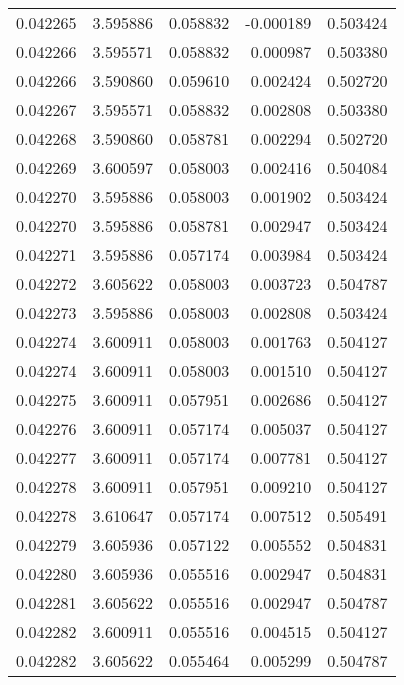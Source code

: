 \begin{tabular}{lrrrr}
0.042265    &  3.595886 &  0.058832 & -0.000189 &             0.503424 \\
0.042266    &  3.595571 &  0.058832 &  0.000987 &             0.503380 \\
0.042266    &  3.590860 &  0.059610 &  0.002424 &             0.502720 \\
0.042267    &  3.595571 &  0.058832 &  0.002808 &             0.503380 \\
0.042268    &  3.590860 &  0.058781 &  0.002294 &             0.502720 \\
0.042269    &  3.600597 &  0.058003 &  0.002416 &             0.504084 \\
0.042270    &  3.595886 &  0.058003 &  0.001902 &             0.503424 \\
0.042270    &  3.595886 &  0.058781 &  0.002947 &             0.503424 \\
0.042271    &  3.595886 &  0.057174 &  0.003984 &             0.503424 \\
0.042272    &  3.605622 &  0.058003 &  0.003723 &             0.504787 \\
0.042273    &  3.595886 &  0.058003 &  0.002808 &             0.503424 \\
0.042274    &  3.600911 &  0.058003 &  0.001763 &             0.504127 \\
0.042274    &  3.600911 &  0.058003 &  0.001510 &             0.504127 \\
0.042275    &  3.600911 &  0.057951 &  0.002686 &             0.504127 \\
0.042276    &  3.600911 &  0.057174 &  0.005037 &             0.504127 \\
0.042277    &  3.600911 &  0.057174 &  0.007781 &             0.504127 \\
0.042278    &  3.600911 &  0.057951 &  0.009210 &             0.504127 \\
0.042278    &  3.610647 &  0.057174 &  0.007512 &             0.505491 \\
0.042279    &  3.605936 &  0.057122 &  0.005552 &             0.504831 \\
0.042280    &  3.605936 &  0.055516 &  0.002947 &             0.504831 \\
0.042281    &  3.605622 &  0.055516 &  0.002947 &             0.504787 \\
0.042282    &  3.600911 &  0.055516 &  0.004515 &             0.504127 \\
0.042282    &  3.605622 &  0.055464 &  0.005299 &             0.504787 \\

\end{tabular}

